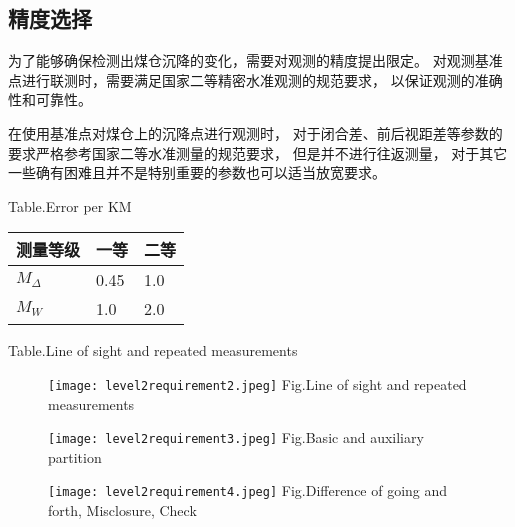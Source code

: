 \subsection{精度选择}
为了能够确保检测出煤仓沉降的变化，需要对观测的精度提出限定。
对观测基准点进行联测时，需要满足国家二等精密水准观测的规范要求，
以保证观测的准确性和可靠性。

在使用基准点对煤仓上的沉降点进行观测时，
对于闭合差、前后视距差等参数的要求严格参考国家二等水准测量的规范要求，
但是并不进行往返测量，
对于其它一些确有困难且并不是特别重要的参数也可以适当放宽要求。
\begin{table}[!htbp]
\begin{center}
			{Table.}{Error per KM}
\begin{tabularx}{15cm}{XXX}
\toprule
测量等级     &  一等     & 二等	 \\
\midrule
$M_\Delta$   &  0.45     & 1.0    \\
$M_W$     	 &  1.0      & 2.0    \\
\bottomrule
\end{tabularx}
\end{center}
\end{table}

\begin{table}[!htbp]
\begin{center}
			{Table.}{Line of sight and repeated measurements}
\end{center}
\end{table}

\begin{figure}[!htbp]
   \centering
   \texttt{[image: level2requirement2.jpeg]}
						{Fig.}{Line of sight and repeated measurements}
\end{figure}

\begin{figure}[!htbp]
   \centering
   \texttt{[image: level2requirement3.jpeg]}
								{Fig.}{Basic and auxiliary partition}
\end{figure}

\begin{figure}[!htbp]
   \centering
   \texttt{[image: level2requirement4.jpeg]}
			{Fig.}{Difference of going and forth, Misclosure, Check}
\end{figure}


